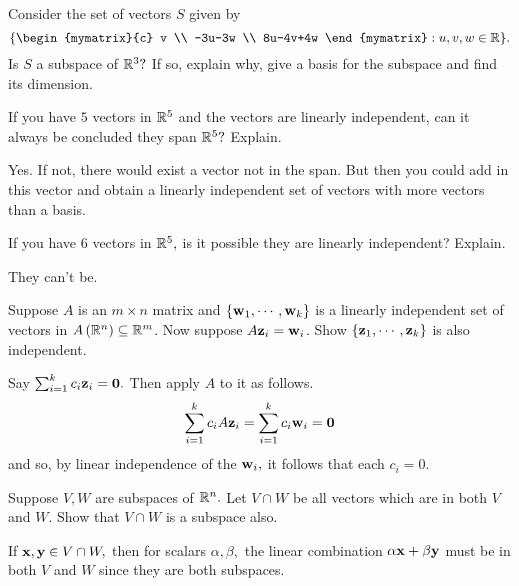 \begin{enumialphparenastyle}
\begin{ex} Consider the set of vectors $S$ given by  
\begin{equation*}
\set{\begin{mymatrix}{c}
v \\ 
-3u-3w \\ 
8u-4v+4w
\end{mymatrix} :u,v,w\in \R} .
\end{equation*}
Is $S$ a subspace of $\mathbb{R}^{3}?$ If so, explain why,
give a basis for the subspace and find its dimension.
\end{ex}

\begin{ex} If you have $5$ vectors in $\mathbb{R}^{5}$ and the vectors are
linearly independent, can it always be concluded they span $\mathbb{R}^{5}?$
Explain. 
\begin{sol}
 Yes. If not, there would exist a vector not in the span. But then
you could add in this vector and obtain a linearly independent set of
vectors with more vectors than a basis.
\end{sol}
\end{ex}

\begin{ex} If you have $6$ vectors in $\mathbb{R}^{5},$ is it possible they are
linearly independent? Explain.
\begin{sol}
They can't be.
\end{sol}
\end{ex}


\begin{ex} Suppose $A$ is an $m\times n$ matrix and $\{{\bf w}
_{1},\cdots ,{\bf w}_{k}\} $ is a linearly independent set of
vectors in $A\left( \mathbb{R}^{n}\right) \subseteq \mathbb{R}^{m}$. Now
suppose $A{\bf z}_{i}={\bf w}_{i}$. Show $\{
{\bf z}_{1},\cdots ,{\bf z}_{k}\} $ is also independent. 
\begin{sol}
 Say $
\sum_{i=1}^{k}c_{i}{\bf z}_{i}={\bf 0}.$ Then apply $A$ to it as follows.
\[
\sum_{i=1}^{k}c_{i}A{\bf z}_{i}=\sum_{i=1}^{k}c_{i}{\bf w}_{i}={\bf 0}
\]
and so, by linear independence of the ${\bf w}_{i},$ it follows that each
$c_{i}=0$.
\end{sol}
\end{ex}

\begin{ex} Suppose $V, W$ are subspaces of $\mathbb{R}^{n}.$ Let $V\cap W$
be all vectors which are in both $V$ and $W$. Show that $V \cap W$ is a subspace also. 
\begin{sol}
If ${\bf x}, {\bf y}\in V\cap W,$ then for scalars $\alpha
,\beta ,$ the linear combination $\alpha {\bf x}+\beta {\bf y}$ must
be in both $V$ and $W$ since they are both subspaces.
\end{sol}
\end{ex}


\end{enumialphparenastyle}

